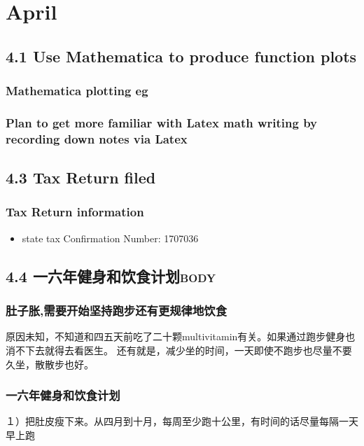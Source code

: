 \documentclass[11pt]{article}
\begin{document}
\section*{April}
\label{sec:orgheadline223}
\subsection*{4.1 Use Mathematica to produce function plots}
\label{sec:orgheadline186}
\subsubsection*{Mathematica plotting eg}
\label{sec:orgheadline184}
\subsubsection*{Plan to get more familiar with Latex math writing by recording down notes via Latex}
\label{sec:orgheadline185}
\subsection*{4.3 Tax Return filed}
\label{sec:orgheadline189}
\subsubsection*{Tax Return information}
\label{sec:orgheadline188}
\begin{itemize}
\item state tax
\label{sec:orgheadline187}
Confirmation Number: 1707036
\end{itemize}
\subsection*{4.4 一六年健身和饮食计划\hfill{}\textsc{body}}
\label{sec:orgheadline192}
\subsubsection*{肚子胀,需要开始坚持跑步还有更规律地饮食}
\label{sec:orgheadline190}
原因未知，不知道和四五天前吃了二十颗multivitamin有关。如果通过跑步健身也消不下去就得去看医生。
还有就是，减少坐的时间，一天即使不跑步也尽量不要久坐，散散步也好。
\subsubsection*{一六年健身和饮食计划}
\label{sec:orgheadline191}

１）把肚皮瘦下来。从四月到十月，每周至少跑十公里，有时间的话尽量每隔一天早上跑
\end{document}
